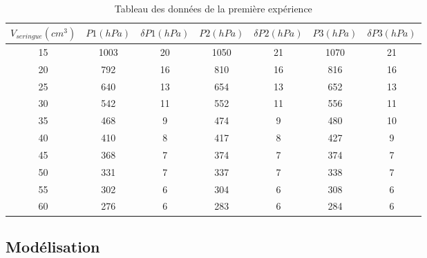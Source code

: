 \documentclass[12pt]{article}
\begin{document}
\begin{table}[h!]
	\begin{center}
		\begin{tabular}{|c|c|c|c|c|c|c|}	
\hline
 $V_{seringue} (cm^3)$ &  $P1 (hPa)$ &  $\delta P1(hPa)$ &  $P2 (hPa)$ &  $\delta P2(hPa)$ &  $P3 (hPa)$ &  $\delta P3(hPa)$ \\
\hline
            15 &              1003 &            20 &              1050 &            21 &              1070 &            21 \\
            20 &               792 &            16 &               810 &            16 &               816 &            16 \\
            25 &               640 &            13 &               654 &            13 &               652 &            13 \\
            30 &               542 &            11 &               552 &            11 &               556 &            11 \\
            35 &               468 &             9 &               474 &             9 &               480 &            10 \\
            40 &               410 &             8 &               417 &             8 &               427 &             9 \\
            45 &               368 &             7 &               374 &             7 &               374 &             7 \\
            50 &               331 &             7 &               337 &             7 &               338 &             7 \\
            55 &               302 &             6 &               304 &             6 &               308 &             6 \\
            60 &               276 &             6 &               283 &             6 &               284 &             6 \\
\hline
		\end{tabular}
	\end{center}
	\label{Tableau première expérience}
	\caption{Tableau des données de la première expérience}
\end{table}



\subsection{Modélisation}
\end{document}
